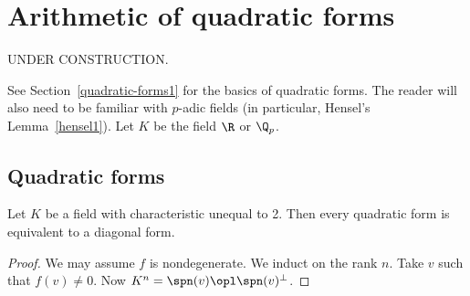 \chapter{Arithmetic of quadratic forms}
UNDER CONSTRUCTION.

See Section~\ref{quadratic-forms1} for the basics of quadratic forms. The reader will also need to be familiar with $p$-adic fields (in particular, Hensel's Lemma~\ref{hensel1}).
Let $K$ be the field $\R$ or $\Q_p$.
\section{Quadratic forms}
\begin{thm}
Let $K$ be a field with characteristic unequal to 2. Then every quadratic form is equivalent to a diagonal form.
\end{thm}
\begin{proof}
We may assume $f$ is nondegenerate. We induct on the rank $n$.
Take $v$ such that $f(v)\ne 0$. Now $K^n=\spn(v)\opl \spn(v)^{\perp}$.
\end{proof}
